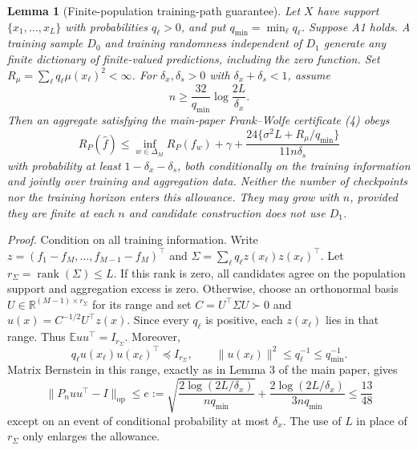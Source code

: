 \documentclass[pdflatex,sn-mathphys-ay]{sn-jnl}
\newtheorem{pathlemma}{Lemma}\renewcommand{\thepathlemma}{S\arabic{pathlemma}}
\theoremstyle{remark}\newtheorem{remark}[theorem]{Remark}
\newcommand{\E}{\mathbb E}
\newcommand{\R}{\mathbb R}
\newcommand{\op}{\mathrm{op}}
\begin{document}
\begin{pathlemma}[Finite-population training-path guarantee]\label{lem:finiteclosure}
Let $X$ have support $\{x_1,\ldots,x_L\}$ with probabilities $q_\ell>0$, and put $q_{\min}=\min_\ell q_\ell$. Suppose A1 holds. A training sample $D_0$ and training randomness independent of $D_1$ generate any finite dictionary of finite-valued predictions, including the zero function. Set $R_\mu=\sum_\ell q_\ell\mu(x_\ell)^2<\infty$. For $\delta_x,\delta_s>0$ with $\delta_x+\delta_s<1$, assume
\[
 n\geq \frac{32}{q_{\min}}\log\frac{2L}{\delta_x}.
\]
Then an aggregate satisfying the main-paper Frank--Wolfe certificate (4) obeys
\begin{equation}\label{eq:finiteclosure}
 R_P(\hat f)\leq\inf_{w\in\Delta_M}R_P(f_w)+\gamma+
 \frac{24\{\sigma^2 L+R_\mu/q_{\min}\}}{11n\delta_s}
\end{equation}
with probability at least $1-\delta_x-\delta_s$, both conditionally on the training information and jointly over training and aggregation data. Neither the number of checkpoints nor the training horizon enters this allowance. They may grow with $n$, provided they are finite at each $n$ and candidate construction does not use $D_1$.
\end{pathlemma}
\noindent\textit{Proof.}
Condition on all training information. Write $z=(f_1-f_M,\ldots,f_{M-1}-f_M)^\top$ and $\Sigma=\sum_\ell q_\ell z(x_\ell)z(x_\ell)^\top$. Let $r_\Sigma=\operatorname{rank}(\Sigma)\leq L$. If this rank is zero, all candidates agree on the population support and aggregation excess is zero. Otherwise, choose an orthonormal basis $U\in\R^{(M-1)\times r_\Sigma}$ for its range and set $C=U^\top\Sigma U\succ0$ and $u(x)=C^{-1/2}U^\top z(x)$. Since every $q_\ell$ is positive, each $z(x_\ell)$ lies in that range. Thus $\E uu^\top=I_{r_\Sigma}$. Moreover,
\[
 q_\ell u(x_\ell)u(x_\ell)^\top\preceq I_{r_\Sigma},
 \qquad \|u(x_\ell)\|^2\leq q_\ell^{-1}\leq q_{\min}^{-1}.
\]
Matrix Bernstein in this range, exactly as in Lemma 3 of the main paper, gives
\[
 \|P_nuu^\top-I\|_{\op}\leq
 e:=\sqrt{\frac{2\log(2L/\delta_x)}{nq_{\min}}}
       +\frac{2\log(2L/\delta_x)}{3nq_{\min}}
 \leq\frac{13}{48}
\]
except on an event of conditional probability at most $\delta_x$. The use of $L$ in place of $r_\Sigma$ only enlarges the allowance.
\end{document}
